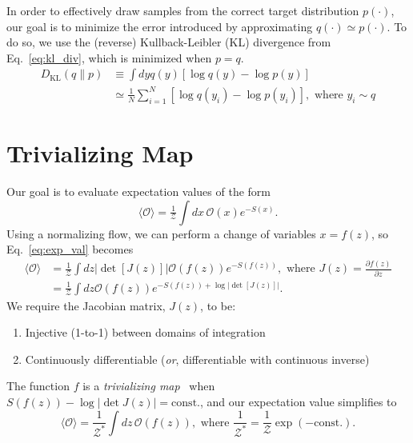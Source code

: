 \documentclass[a4paper,11pt]{article}
\begin{document}
In order to effectively draw samples from the correct target distribution
\(p(\cdot)\), our goal is to minimize the error introduced by approximating
\(q(\cdot)\simeq p(\cdot)\).
%
To do so, we use the (reverse) Kullback-Leibler (KL) divergence from
Eq.~\ref{eq:kl_div}, which is minimized when \(p=q\).
%
\begin{align}
    \label{eq:kl_div}
    D_{\mathrm{KL}}(q\|p) 
    &\equiv\int dy q(y)\left[\log q(y) - \log p(y)\right]\\
    &\simeq \frac{1}{N}\sum_{i=1}^{N} \left[\log q(y_{i})-\log p(y_{i})\right],
        \,\,\text{where}\,\, y_{i}\sim q
\end{align}
%
\section{\label{sec:trivializing_map}Trivializing Map}
%
Our goal is to evaluate expectation values of the form
%
\begin{equation}
    \label{eq:exp_val}
    \langle \mathcal{O} \rangle = \tfrac{1}{\mathcal{Z}} \int dx\, \mathcal{O} (x) e^{-S(x)}.
\end{equation}
%
Using a normalizing flow, we can perform a change of variables \(x = f(z)\), so
Eq.~\ref{eq:exp_val} becomes
%
\begin{align}
    \langle \mathcal{O} \rangle 
    &= \frac{1}{\mathcal{Z}} \int dz \left|\det \left[ J(z) \right]\right|
        \mathcal{O} (f(z)) e^{-S(f(z))},
        \text{ where } J (z) = \frac{\partial f(z)}{\partial z} \\
    &= \frac{1}{\mathcal{Z}}\int dz \mathcal{O} (f(z)) e^{-S(f(z))
        + \log |\det[J(z)]|}.
\end{align}
%
We require the Jacobian matrix, \(J(z)\), to be:
%
\begin{enumerate}
    \item Injective (1-to-1) between domains of integration
    \item Continuously differentiable (\emph{or}, differentiable with
        continuous inverse)
\end{enumerate}
%
The function \(f\) is a \emph{trivializing map}~\cite{luscher2009} when
\(S(f(z)) - \log\left|\det J(z)\right| = \text{const.}\), and our expectation
value simplifies to
%
\begin{equation}
    \langle\mathcal{O}\rangle = 
    \frac{1}{\mathcal{Z}^{\ast}}\int dz\, \mathcal{O}(f(z)), \text{ where }
    \frac{1}{\mathcal{Z}^{\ast}} 
    = \frac{1}{\mathcal{Z}}\exp(-\text{const.}).
\end{equation}
%
\end{document}
